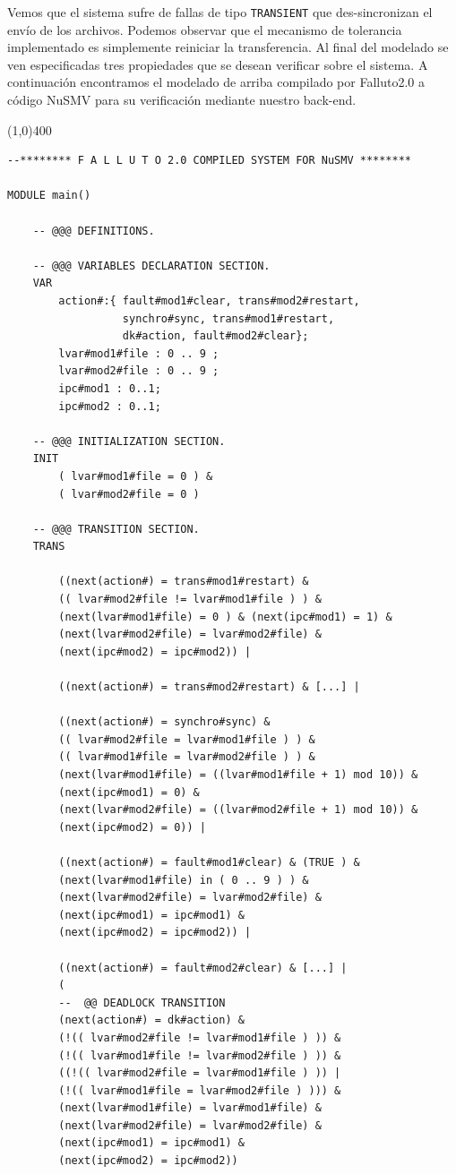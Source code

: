\documentclass[pdftex,a4paper,12pt]{book}
\begin{document}
Vemos que el sistema sufre de fallas de tipo \texttt{TRANSIENT} que des-sincronizan el env\'io de los archivos. Podemos observar que el mecanismo de tolerancia implementado es simplemente reiniciar la transferencia. Al final del modelado se ven especificadas tres propiedades que se desean verificar sobre el sistema. A continuaci\'on encontramos el modelado de arriba compilado por Falluto2.0 a c\'odigo NuSMV para su verificaci\'on mediante nuestro back-end. 

\noindent \line(1,0){400}
\begin{verbatim}
--******** F A L L U T O 2.0 COMPILED SYSTEM FOR NuSMV ********

MODULE main()

    -- @@@ DEFINITIONS.

    -- @@@ VARIABLES DECLARATION SECTION.
    VAR
        action#:{ fault#mod1#clear, trans#mod2#restart,
                  synchro#sync, trans#mod1#restart, 
                  dk#action, fault#mod2#clear};
        lvar#mod1#file : 0 .. 9 ;
        lvar#mod2#file : 0 .. 9 ;
        ipc#mod1 : 0..1;
        ipc#mod2 : 0..1;

    -- @@@ INITIALIZATION SECTION.
    INIT
        ( lvar#mod1#file = 0 ) & 
        ( lvar#mod2#file = 0 )

    -- @@@ TRANSITION SECTION.
    TRANS
        
        ((next(action#) = trans#mod1#restart) & 
        (( lvar#mod2#file != lvar#mod1#file ) ) & 
        (next(lvar#mod1#file) = 0 ) & (next(ipc#mod1) = 1) & 
        (next(lvar#mod2#file) = lvar#mod2#file) & 
        (next(ipc#mod2) = ipc#mod2)) | 
        
        ((next(action#) = trans#mod2#restart) & [...] |
         
        ((next(action#) = synchro#sync) & 
        (( lvar#mod2#file = lvar#mod1#file ) ) &
        (( lvar#mod1#file = lvar#mod2#file ) ) &
        (next(lvar#mod1#file) = ((lvar#mod1#file + 1) mod 10)) &
        (next(ipc#mod1) = 0) &
        (next(lvar#mod2#file) = ((lvar#mod2#file + 1) mod 10)) &
        (next(ipc#mod2) = 0)) | 

        ((next(action#) = fault#mod1#clear) & (TRUE ) &
        (next(lvar#mod1#file) in ( 0 .. 9 ) ) &
        (next(lvar#mod2#file) = lvar#mod2#file) &
        (next(ipc#mod1) = ipc#mod1) & 
        (next(ipc#mod2) = ipc#mod2)) |

        ((next(action#) = fault#mod2#clear) & [...] | 
        (
        --  @@ DEADLOCK TRANSITION
        (next(action#) = dk#action) & 
        (!(( lvar#mod2#file != lvar#mod1#file ) )) &
        (!(( lvar#mod1#file != lvar#mod2#file ) )) &
        ((!(( lvar#mod2#file = lvar#mod1#file ) )) |
        (!(( lvar#mod1#file = lvar#mod2#file ) ))) &
        (next(lvar#mod1#file) = lvar#mod1#file) &
        (next(lvar#mod2#file) = lvar#mod2#file) &
        (next(ipc#mod1) = ipc#mod1) &
        (next(ipc#mod2) = ipc#mod2))


\end{verbatim}
\end{document}
